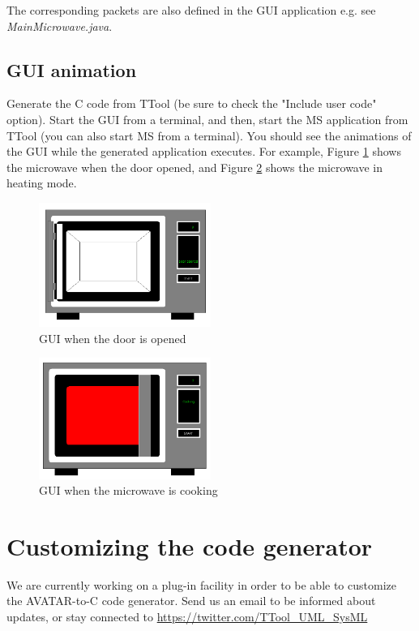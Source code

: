 \documentclass[12pt]{article}
\begin{document}
The corresponding packets are also defined in the GUI application e.g. see \textit{MainMicrowave.java}. 

\subsection{GUI animation}
Generate the C code from TTool (be sure to check the "Include user code" option). Start the GUI from a terminal, and then, start the MS application from TTool (you can also start MS from a terminal). You should see the animations of the GUI while the generated application executes. For example, Figure \ref{fig:animopen} shows the microwave when the door opened, and Figure \ref{fig:animcooking} shows the microwave in heating mode.

\begin{figure}[htbp]
\centering
\includegraphics[width=0.5\textwidth]{figures/animopen}
\caption{GUI when the door is opened} \label{fig:animopen}
\end{figure}

\begin{figure}[htbp]
\centering
\includegraphics[width=0.5\textwidth]{figures/animcooking}
\caption{GUI when the microwave is cooking} \label{fig:animcooking}
\end{figure}


\newpage
\section{Customizing the code generator}\label{sec:customgenerator}
We are currently working on a plug-in facility in order to be able to customize the AVATAR-to-C code generator. Send us an email to be informed about updates, or stay connected to \url{https://twitter.com/TTool_UML_SysML}
\end{document}
